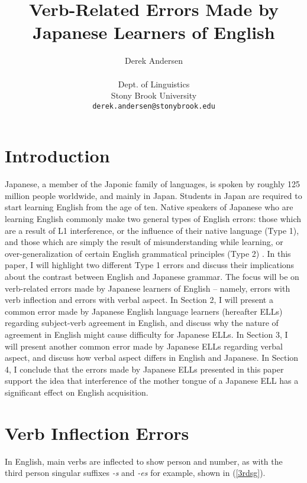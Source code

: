 \documentclass{article}
\begin{document}
\title{Verb-Related Errors Made by Japanese Learners of English}
\author{Derek Andersen \\ \\
        Dept. of Linguistics \\
		Stony Brook University \\
		\texttt{derek.andersen@stonybrook.edu}} 
\date{}
\maketitle

\section{Introduction}
Japanese, a member of the Japonic family of languages, is spoken by roughly 125 million people worldwide, and mainly in Japan. Students in Japan are required to start learning English from the age of ten. Native speakers of Japanese who are learning English commonly make two general types of English errors: those which are a result of L1 interference, or the influence of their native language (Type 1), and those which are simply the result of misunderstanding while learning, or over-generalization of certain English grammatical principles (Type 2) \citep{Bryant1984}. In this paper, I will highlight two different Type 1 errors and discuss their implications about the contrast between English and Japanese grammar. The focus will be on verb-related errors made by Japanese learners of English -- namely, errors with verb inflection and errors with verbal aspect. In Section 2, I will present a common error made by Japanese English language learners (hereafter ELLs) regarding subject-verb agreement in English, and discuss why the nature of agreement in English might cause difficulty for Japanese ELLs. In Section 3, I will present another common error made by Japanese ELLs regarding verbal aspect, and discuss how verbal aspect differs in English and Japanese. In Section 4, I conclude that the errors made by Japanese ELLs presented in this paper support the idea that interference of the mother tongue of a Japanese ELL has a significant effect on English acquisition.

\section{Verb Inflection Errors}

In English, main verbs are inflected to show person and number, as with the third person singular suffixes \textit{-s} and \textit{-es} for example, shown in (\ref{3rdsg}).
\end{document}

